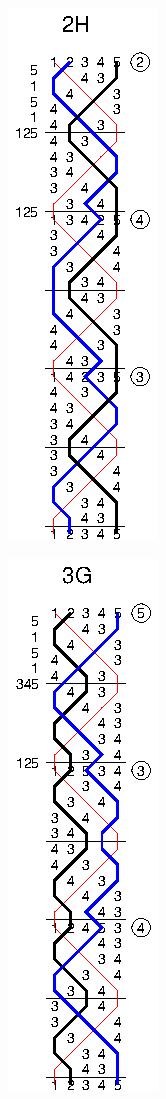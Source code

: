 \begin{figure}[t]
\begin{subfigure}{0.24\textwidth}
    \includegraphics{figs/methods/single-hunt/2H}
  \end{subfigure}
  \begin{subfigure}{0.24\textwidth}
    \includegraphics{figs/methods/single-hunt/3G}

\end{subfigure}
\end{figure}
